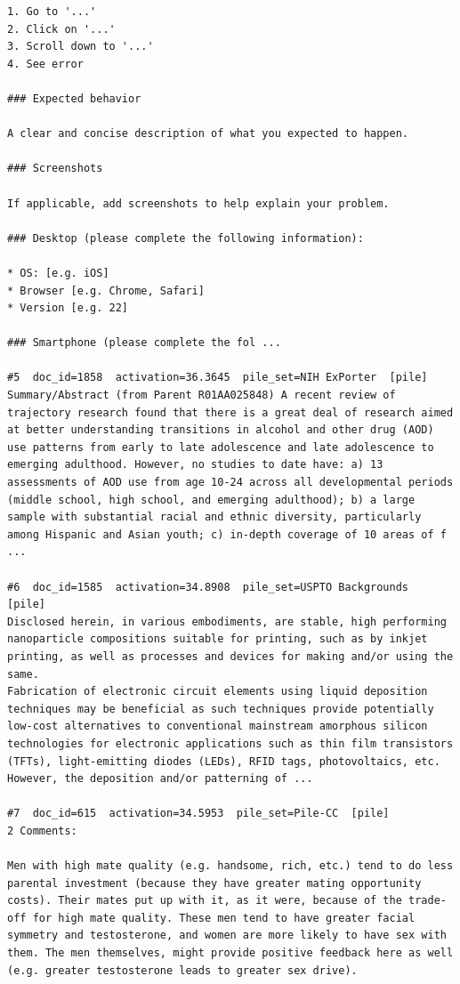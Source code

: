 \begin{verbatim}
1. Go to '...'
2. Click on '...'
3. Scroll down to '...'
4. See error

### Expected behavior

A clear and concise description of what you expected to happen.

### Screenshots

If applicable, add screenshots to help explain your problem.

### Desktop (please complete the following information):

* OS: [e.g. iOS]
* Browser [e.g. Chrome, Safari]
* Version [e.g. 22]

### Smartphone (please complete the fol ...

#5  doc_id=1858  activation=36.3645  pile_set=NIH ExPorter  [pile]
Summary/Abstract (from Parent R01AA025848) A recent review of trajectory research found that there is a great deal of research aimed at better understanding transitions in alcohol and other drug (AOD) use patterns from early to late adolescence and late adolescence to emerging adulthood. However, no studies to date have: a) 13 assessments of AOD use from age 10-24 across all developmental periods (middle school, high school, and emerging adulthood); b) a large sample with substantial racial and ethnic diversity, particularly among Hispanic and Asian youth; c) in-depth coverage of 10 areas of f ...

#6  doc_id=1585  activation=34.8908  pile_set=USPTO Backgrounds  [pile]
Disclosed herein, in various embodiments, are stable, high performing nanoparticle compositions suitable for printing, such as by inkjet printing, as well as processes and devices for making and/or using the same.
Fabrication of electronic circuit elements using liquid deposition techniques may be beneficial as such techniques provide potentially low-cost alternatives to conventional mainstream amorphous silicon technologies for electronic applications such as thin film transistors (TFTs), light-emitting diodes (LEDs), RFID tags, photovoltaics, etc. However, the deposition and/or patterning of ...

#7  doc_id=615  activation=34.5953  pile_set=Pile-CC  [pile]
2 Comments:

Men with high mate quality (e.g. handsome, rich, etc.) tend to do less parental investment (because they have greater mating opportunity costs). Their mates put up with it, as it were, because of the trade-off for high mate quality. These men tend to have greater facial symmetry and testosterone, and women are more likely to have sex with them. The men themselves, might provide positive feedback here as well (e.g. greater testosterone leads to greater sex drive).


\end{verbatim}
